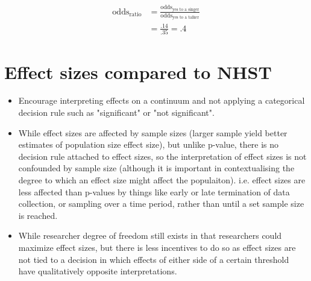 \begin{equation}
\nonumber
\begin{split}
\text{odds}_{\text{ratio}} & = \frac{\text{odds}_{\text{yes to a singer}}}{\text{odds}_{\text{yes to a talker}}} \\ 
&= \frac{.14}{.35} = .4
\end{split}
\end{equation}

\section{Effect sizes compared to NHST}
\begin{itemize}
\item Encourage interpreting effects on a continuum and not applying a categorical decision rule such as "significant" or "not significant". 
\item While effect sizes are affected by sample sizes (larger sample yield better estimates of population size effect size), but unlike p-value, there is no decision rule attached to effect sizes, so the interpretation of effect sizes is not confounded by sample size (although it is important in contextualising the degree to which an effect size might affect the populaiton). i.e. effect sizes are less affected than p-values by things like early or late termination of data collection, or sampling over a time period, rather than until a set sample size is reached. 
\item While researcher degree of freedom still exists in that researchers could maximize effect sizes, but there is less incentives to do so as effect sizes are not tied to a decision in which effects of either side of a certain threshold have qualitatively opposite interpretations.
\end{itemize}